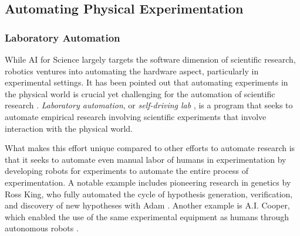 

\subsection{Automating Physical Experimentation}

\subsubsection{Laboratory Automation}
While AI for Science largely targets the software dimension of scientific research, robotics ventures into automating the hardware aspect, particularly in experimental settings. It has been pointed out that automating experiments in the physical world is crucial yet challenging for the automation of scientific research \cite{coley2020autonomous,zenil2023}. 
 \textit{Laboratory automation}, or \textit{self-driving lab} \cite{abolhasani2023rise}, is a program that seeks to automate empirical research involving scientific experiments that involve interaction with the physical world.

What makes this effort unique compared to other efforts to automate research is that it seeks to automate even manual labor of humans in experimentation by developing robots for experiments to automate the entire process of experimentation. A notable example includes pioneering research in genetics by Ross King, who fully automated the cycle of hypothesis generation, verification, and discovery of new hypotheses with Adam \cite{king2004functional}. Another example is A.I. Cooper, which enabled the use of the same experimental equipment as humans through autonomous robots \cite{burger2020mobile}. 

